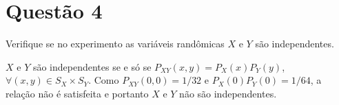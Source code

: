 \section{Questão 4}
Verifique se no experimento as variáveis randômicas $X$ e $Y$ são independentes.

\begin{respostas}

$X$ e $Y$ são independentes se e só se 
$P_{XY}(x, y) = P_X(x) P_Y(y)$, $\forall (x, y) \in S_X \times S_Y$.
%
Como $P_{XY}(0, 0) = 1/32$ e $P_X(0)P_Y(0) = 1/64$, a relação não é satisfeita e portanto $X$ e $Y$ não são independentes.

\end{respostas}